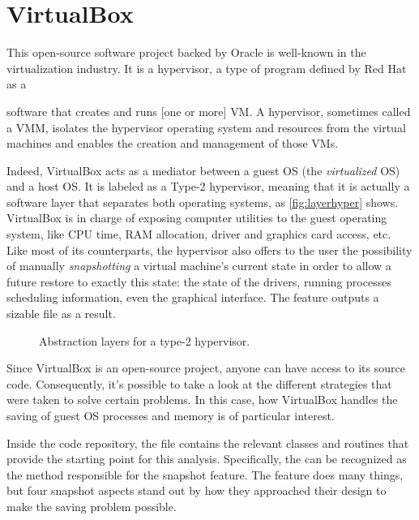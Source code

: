 \section{VirtualBox}\label{sec:virtualbox}
This open-source software project backed by Oracle is well-known in the virtualization industry. It is a hypervisor, a type of program defined by Red Hat as a
\begin{shadedquotation}
	[...] software that creates and runs [one or more] \gls{VM}. A hypervisor, sometimes called a \gls{VMM}, isolates the hypervisor operating system and resources from the virtual machines and enables the creation and management of those VMs.\cite{online:redhat}
\end{shadedquotation}
Indeed, VirtualBox acts as a mediator between a guest OS (the \textit{virtualized} OS) and a host OS. It is labeled as a Type-2 hypervisor, meaning that it is actually a software layer that separates both operating systems, as \autoref{fig:layerhyper} shows. VirtualBox is in charge of exposing computer utilities to the guest operating system, like CPU time, RAM allocation, driver and graphics card access, etc. Like most of its counterparts, the hypervisor also offers to the user the possibility of manually \textit{snapshotting} a virtual machine's current state in order to allow a future restore to exactly this state: the state of the drivers, running processes scheduling information, even the graphical interface. The feature outputs a sizable file as a result.

\begin{figure}
	\centering \scriptsize
	\vspace{-12pt}
	
	\caption{Abstraction layers for a type-2 hypervisor.}
	\label{fig:layerhyper}
	\vspace{-24pt}
\end{figure}
Since VirtualBox is an open-source project, anyone can have access to its source code. Consequently, it's possible to take a look at the different strategies that were taken to solve certain problems. In this case, how VirtualBox handles the saving of guest OS processes and memory is of particular interest.

Inside the code repository, the  file contains the relevant \Cpp classes and routines that provide the starting point for this analysis. Specifically, the  can be recognized as the method responsible for the snapshot feature. The feature does many things, but four snapshot aspects stand out by how they approached their design to make the saving problem possible.

